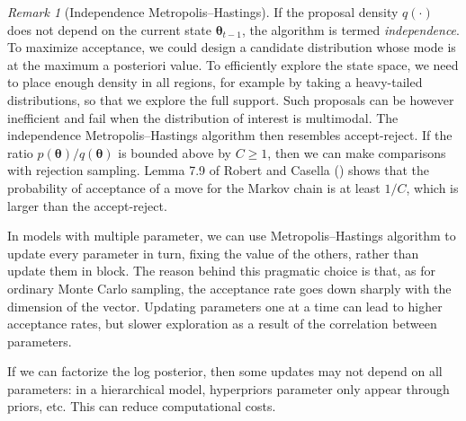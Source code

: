 \documentclass[
  11pt,
  letterpaper,
]{scrbook}
\theoremstyle{definition}
\theoremstyle{definition}
\theoremstyle{definition}
\theoremstyle{plain}
\theoremstyle{plain}
\theoremstyle{remark}
\newtheorem*{remark}{Remark}
\begin{document}
\begin{remark}[Independence Metropolis--Hastings]
If the proposal density \(q(\cdot)\) does not depend on the current
state \(\boldsymbol{\theta}_{t-1}\), the algorithm is termed
\emph{independence}. To maximize acceptance, we could design a candidate
distribution whose mode is at the maximum a posteriori value. To
efficiently explore the state space, we need to place enough density in
all regions, for example by taking a heavy-tailed distributions, so that
we explore the full support. Such proposals can be however inefficient
and fail when the distribution of interest is multimodal. The
independence Metropolis--Hastings algorithm then resembles
accept-reject. If the ratio
\(p(\boldsymbol{\theta})/q(\boldsymbol{\theta})\) is bounded above by
\(C \geq 1\), then we can make comparisons with rejection sampling.
Lemma 7.9 of Robert and Casella
() shows that the probability of
acceptance of a move for the Markov chain is at least \(1/C\), which is
larger than the accept-reject.
\end{remark}

In models with multiple parameter, we can use Metropolis--Hastings
algorithm to update every parameter in turn, fixing the value of the
others, rather than update them in block. The reason behind this
pragmatic choice is that, as for ordinary Monte Carlo sampling, the
acceptance rate goes down sharply with the dimension of the vector.
Updating parameters one at a time can lead to higher acceptance rates,
but slower exploration as a result of the correlation between
parameters.

If we can factorize the log posterior, then some updates may not depend
on all parameters: in a hierarchical model, hyperpriors parameter only
appear through priors, etc. This can reduce computational costs.
\end{document}
